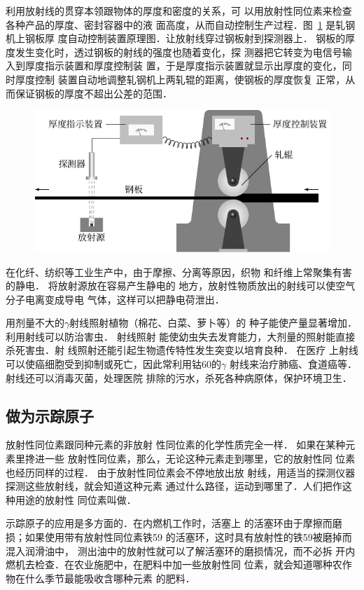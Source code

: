 利用放射线的贯穿本领跟物体的厚度和密度的关系，可
以用放射性同位素来检查各种产品的厚度、密封容器中的液
面高度，从而自动控制生产过程．图~\ref{fig_C_9-10} 是轧钢机上钢板厚
度自动控制装置原理图．让放射线穿过钢板射到探测器上．
钢板的厚度发生变化时，透过钢板的射线的强度也随着变化，探
测器把它转变为电信号输入到厚度指示装置和厚度控制装
置，于是厚度指示装置就显示出厚度的变化，同时厚度控制
装置自动地调整轧钢机上两轧辊的距离，使钢板的厚度恢复
正常，从而保证钢板的厚度不超出公差的范围．
\begin{figure}[htbp]
    \centering
    \includegraphics{fig/C/9-10.pdf}
    \caption{}\label{fig_C_9-10}
\end{figure}

在化纤、纺织等工业生产中，由于摩擦、分离等原因，织物
和纤维上常聚集有害的静电．
将放射源放在容易产生静电的
地方，放射性物质放出的射线可以使空气分子电离变成导电
气体，这样可以把静电荷泄出．

用剂量不大的$\gamma$射线照射植物（棉花、白菜、萝卜等）的
种子能使产量显著增加．利用射线可以防治害虫．
射线照射
能使幼虫失去发育能力，大剂量的照射能直接杀死害虫．射
线照射还能引起生物遗传特性发生突变以培育良种．
在医疗
上射线可以使癌细胞受到抑制或死亡，因此常利用钴60的$\gamma$
射线来治疗肺癌、食道癌等．射线还可以消毒灭菌，处理医院
排除的污水，杀死各种病原体，保护环境卫生．

\subsection{做为示踪原子}

放射性同位素跟同种元素的非放射
性同位素的化学性质完全一样．
如果在某种元素里搀进一些
放射性同位素，那么，无论这种元素走到哪里，它的放射性同
位素也经历同样的过程．
由于放射性同位素会不停地放出放
射线，用适当的探测仪器探测这些放射线，就会知道这种元素
通过什么路径，运动到哪里了．人们把作这种用途的放射性
同位素叫做．

示踪原子的应用是多方面的．在内燃机工作时，活塞上
的活塞环由于摩擦而磨损；如果使用带有放射性同位素铁59
的活塞环，这时具有放射性的铁59被磨掉而混入润滑油中，
测出油中的放射性就可以了解活塞环的磨损情况，而不必拆
开内燃机去检查．在农业施肥中，在肥料中加一些放射性同
位素，就会知道哪种农作物在什么季节最能吸收含哪种元素
的肥料．

